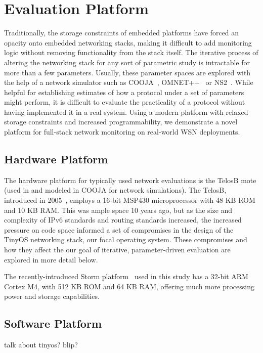 \section{Evaluation Platform}

Traditionally, the storage constraints of embedded platforms have forced an opacity onto embedded networking stacks, making it difficult to add monitoring logic without removing functionality from the stack itself.
The iterative process of altering the networking stack for any sort of parametric study is intractable for more than a few parameters.
Usually, these parameter spaces are explored with the help of a network simulator such as COOJA~\cite{cooja}, OMNET++~\cite{omnet++} or NS2~\cite{ns2}.
While helpful for establishing estimates of how a protocol under a set of parameters might perform, it is difficult to evaluate the practicality of a protocol without having implemented it in a real system.
Using a modern platform with relaxed storage constraints and increased programmability, we demonstrate a novel platform for full-stack network monitoring on real-world WSN deployments.

\subsection{Hardware Platform}

The hardware platform for typically used network evaluations is the TelosB mote (used in \cite{ko2011evaluating} and modeled in COOJA for network simulations).
The TelosB, introduced in 2005~\cite{polastre2005telos},  employs a 16-bit MSP430 microprocessor with 48 KB ROM and 10 KB RAM.
This was ample space 10 years ago, but as the size and complexity of IPv6 standards and routing standards increased, the increased pressure on code space informed a set of compromises in the design of the TinyOS networking stack, our focal operating system.
These compromises and how they affect the our goal of iterative, parameter-driven evaluation are explored in more detail below.

The recently-introduced Storm platform~\cite{andersen2016system} used in this study has a 32-bit ARM Cortex M4, with 512 KB ROM and 64 KB RAM, offering much more processing power and storage capabilities.

\subsection{Software Platform}
talk about tinyos? blip?

